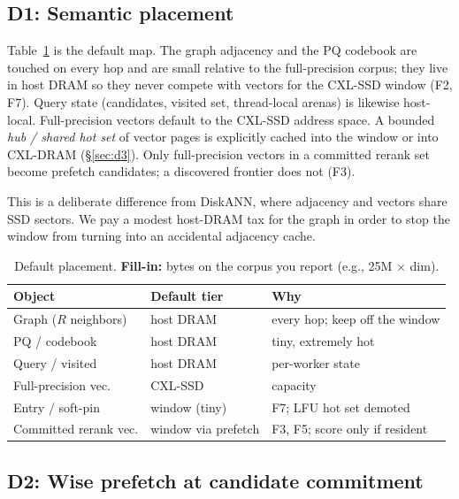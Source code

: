 \subsection{D1: Semantic placement}
\label{sec:d1}

Table~\ref{tab:placement} is the default map.
The graph adjacency and the PQ codebook are touched on every hop and are small relative to the full-precision corpus; they live in host DRAM so they never compete with vectors for the CXL-SSD window (F2, F7).
Query state (candidates, visited set, thread-local arenas) is likewise host-local.
Full-precision vectors default to the CXL-SSD address space.
A bounded \emph{hub / shared hot set} of vector pages is explicitly cached into the window or into CXL-DRAM (\S\ref{sec:d3}).
Only full-precision vectors in a committed rerank set become prefetch candidates; a discovered frontier does not (F3).

This is a deliberate difference from DiskANN, where adjacency and vectors share SSD sectors.
We pay a modest host-DRAM tax for the graph in order to stop the window from turning into an accidental adjacency cache.

\begin{table}[t]
  \caption{Default placement. \textbf{Fill-in:} bytes on the corpus you report (e.g., 25M $\times$ dim).}
  \label{tab:placement}
  \small
  \begin{tabular}{@{}p{}p{}p{}@{}}
    \toprule
    Object & Default tier & Why \\
    \midrule
    Graph ($R$ neighbors) & host DRAM & every hop; keep off the window \\
    PQ / codebook        & host DRAM & tiny, extremely hot \\
    Query / visited      & host DRAM & per-worker state \\
    Full-precision vec.  & CXL-SSD   & capacity \\
    Entry / soft-pin     & window (tiny) & F7; LFU hot set demoted \\
    Committed rerank vec. & window via prefetch & F3, F5; score only if resident \\
    \bottomrule
  \end{tabular}
\end{table}

\subsection{D2: Wise prefetch at candidate commitment}
\label{sec:d2}

